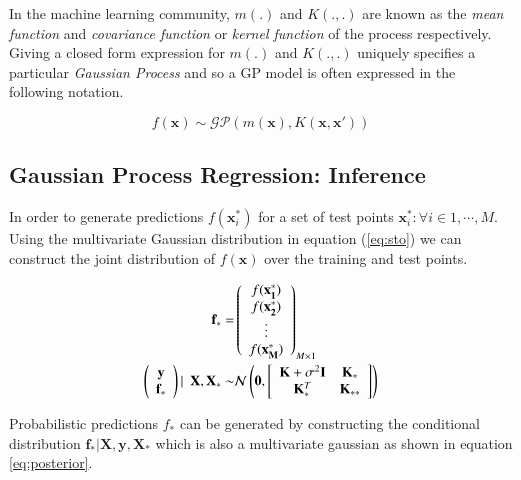 \documentclass{article}
\begin{document}
In the machine learning community, $m(.)$ and $K(.,.)$ are known as the \emph{mean function} and \emph{covariance function} or \emph{kernel function} of the process respectively. Giving a closed form expression for $m(.)$ and $K(.,.)$ uniquely specifies a particular \emph{Gaussian Process} and so a GP model is often expressed in the following notation.

\begin{equation}
  f(\mathbf{x}) \sim \mathcal{GP}(m(\mathbf{x}), K(\mathbf{x}, \mathbf{x}'))
\end{equation}

\subsection{Gaussian Process Regression: Inference}

In order to generate predictions $f(\mathbf{x}^{*}_i)$ for a set of test points $ {\mathbf{x}^{*}_i : \forall i \in 1, \cdots, M} $. Using the multivariate Gaussian distribution in equation (\ref{eq:sto}) we can construct the joint distribution of $f(\mathbf{x})$ over the training and test points.

\begin{align}
  \mathbf{f}_* = & \left( \begin{array}{c} f(\mathbf{x^{*}_1}) \\ f(\mathbf{x^{*}_2}) \\ \vdots \\ f(\mathbf{x^{*}_M}) \end{array} \right)_{M \times 1} \\
  \vspace{4\baselineskip}
  \left( \begin{array}{c} \mathbf{y} \\ \mathbf{f_*} \end{array} \right) | \ \ \mathbf{X}, \mathbf{X}_* \sim & 
                                                                                                               \mathcal{N}\left(\mathbf{0}, \left[ \begin{array}{cc} \mathbf{K} + \sigma^{2} \mathbf{I} & \mathbf{K}_{*} \\ \mathbf{K}_{*}^T & \mathbf{K}_{**} \end{array} \right ] \right) \label{eq:dist}
\end{align}

Probabilistic predictions $f_*$ can be generated by constructing the conditional distribution $\mathbf{f_*}|\mathbf{X},\mathbf{y},\mathbf{X_*}$ which is also a multivariate gaussian as shown in equation \ref{eq:posterior}.
\end{document}
